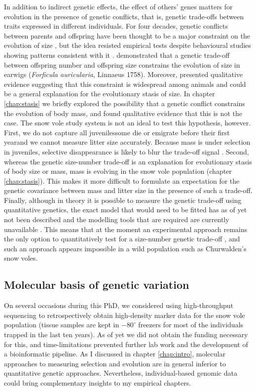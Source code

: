 In addition to indirect genetic effects, the effect of others' genes matters for evolution in the presence of genetic conflicts, that is, genetic trade-offs between traits expressed in different individuals.
For four decades, genetic conflicts between parents and offspring have been thought to be a major constraint on the evolution of size \parencite[since][]{Trivers1974}, but the idea resisted empirical tests despite behavioural studies showing patterns consistent with it \parencite{Kolliker2015}. \cite{Kolliker2015} demonstrated that a genetic trade-off between offspring number and offspring size constrains the evolution of size in earwigs (\textit{Forficula auricularia}, Linnaeus 1758). Moreover, \cite{Rollinson2015b} presented qualitative evidence suggesting that this constraint is widespread among animals and could be a general explanation for the evolutionary stasis of size. 
In chapter \ref{chap:stasis} we briefly explored the possibility that a genetic conflict constrains the evolution of body mass, and found qualitative evidence that this is not the case. The snow vole study system is not an ideal to test this hypothesis, however. First, we do not capture all juveniles\textemdash some die or emigrate before their first year\textemdash and we cannot measure litter size accurately. Because mass is under selection in juveniles, selective disappearance is likely to blur the trade-off signal \parencite{Hadfield2011}. Second, whereas the genetic size-number trade-off is an explanation for evolutionary stasis of body size or mass,  mass is evolving in the snow vole population (chapter \ref{chap:stasis}). This makes it more difficult to formulate an expectation for the genetic covariance between mass and litter size in the presence of such a trade-off. 
Finally, although in theory it is possible to measure the genetic trade-off using quantitative genetics, the exact model that would need to be fitted has as of yet not been described and the modelling tools that are required are currently unavailable \parencite{Hadfield2012, Rollinson2015b}. This means that at the moment an experimental approach remains the only option to quantitatively test for a size-number genetic trade-off \parencite{Kolliker2015}, and such an approach appears impossible in a wild population such as Churwalden's snow voles. 

\subsection{Molecular basis of genetic variation}
On several occasions during this PhD, we considered using high-throughput sequencing \parencite{VanDijk2014} to  retrospectively obtain high-density marker data for the snow vole population (tissue samples are kept in $-80^\circ$ freezers for most of the individuals trapped in the last ten years).
As of yet we did not obtain the funding necessary for this, and time-limitations prevented further lab work and the development of a bioinformatic pipeline. 
As I discussed in chapter \ref{chap:intro}, molecular approaches to measuring selection and evolution are in general inferior to quantitative genetic approaches. Nevertheless, individual-based genomic data could bring complementary insights to my empirical chapters.

